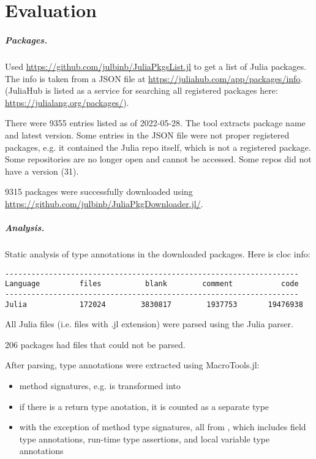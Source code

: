 \chapter{Evaluation}\label{chap:eval}

\paragraph{Packages.}
Used \url{https://github.com/julbinb/JuliaPkgsList.jl} to get a list of
Julia packages.
The info is taken from a JSON file at
\url{https://juliahub.com/app/packages/info}.
(JuliaHub is listed as a service for searching all registered packages
here: \url{https://julialang.org/packages/}).

There were 9355 entries listed as of 2022-05-28.
The tool extracts package name and latest version.
Some entries in the JSON file were not proper registered packages,
e.g. it contained the Julia repo itself, which is not a registered package.
Some repositories are no longer open and cannot be accessed.
Some repos did not have a version (31).

9315 packages were successfully downloaded using
\url{https://github.com/julbinb/JuliaPkgDownloader.jl/}.

\paragraph{Analysis.}
Static analysis of type annotations in the downloaded packages.
Here is cloc info:

\begin{verbatim}
-------------------------------------------------------------------
Language         files          blank        comment           code
-------------------------------------------------------------------
Julia            172024        3830817        1937753       19476938
\end{verbatim}

All Julia files (i.e. files with .jl extension) were parsed using
the Julia parser.

206 packages had files that could not be parsed.

After parsing, type annotations were extracted using MacroTools.jl:
\begin{itemize}
    \item method signatures, e.g. 
      is transformed into 
    \item if there is a return type anotation, it is counted as a separate type
    \item with the exception of method type signatures, all  from
        , which includes field type annotations, run-time type assertions,
        and local variable type annotations
\end{itemize}


